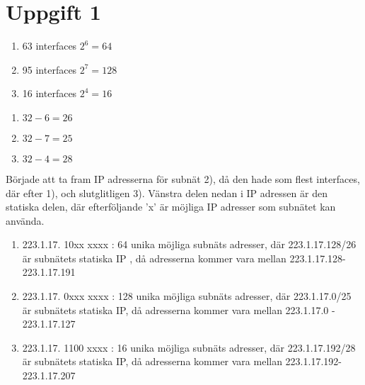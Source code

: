 \section{Uppgift 1}

\begin{enumerate}
\item 63 interfaces \aprox $2^6 = 64$
\item 95 interfaces \aprox $2^7 = 128 $
\item 16 interfaces \aprox $2^4 = 16 $
\end{enumerate}



\begin{enumerate}[ Nätmasker:]
\item $32-6=26$
\item $32-7=25$
\item $32-4=28$
\end{enumerate}


Började att ta fram IP adresserna för subnät 2), då den hade som flest interfaces, där efter 1), och
slutglitligen 3).  Vänstra delen nedan i IP adressen är den statiska delen, där efterföljande 'x' är
möjliga IP adresser som subnätet kan använda.
\begin{enumerate}[ IP adress:]
\item 223.1.17. 10xx xxxx : 64 unika möjliga subnäts adresser, där 223.1.17.128/26 är subnätets
statiska IP
, då adresserna kommer vara mellan 223.1.17.128-223.1.17.191
\item 223.1.17. 0xxx xxxx : 128 unika möjliga subnäts adresser, där 223.1.17.0/25 är subnätets
statiska IP, då adresserna kommer vara
mellan
223.1.17.0 - 223.1.17.127
\item 223.1.17. 1100 xxxx : 16 unika möjliga subnäts adresser, där 223.1.17.192/28 är subnätets
statiska IP, då adresserna kommer vara
mellan 223.1.17.192-223.1.17.207
\end{enumerate}

